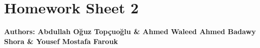 \documentclass{article}
\begin{document}
\section*{\huge Homework Sheet 2}
\begin{flushright}
   \textbf{Authors: Abdullah Oğuz Topçuoğlu \& Ahmed Waleed Ahmed Badawy Shora \& Yousef Mostafa Farouk}
\end{flushright}

\end{document}

